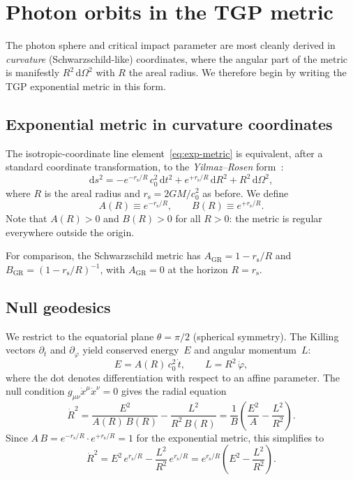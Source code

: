 \documentclass[11pt,a4paper]{article}
\theoremstyle{definition}
\theoremstyle{remark}
\newcommand{\rs}{r_{\mathrm{s}}}
\newcommand{\dd}{\mathrm{d}}
\begin{document}
\section{Photon orbits in the TGP metric}\label{sec:photon}

The photon sphere and critical impact parameter are most cleanly derived
in \emph{curvature} (Schwarzschild-like) coordinates, where the angular
part of the metric is manifestly $R^2\,\dd\Omega^2$ with $R$ the areal
radius.  We therefore begin by writing the TGP exponential metric in
this form.

\subsection{Exponential metric in curvature coordinates}

The isotropic-coordinate line element~\eqref{eq:exp-metric} is
equivalent, after a standard coordinate transformation, to the
\emph{Yilmaz--Rosen} form~\cite{Perlick2022,Rezzolla2014}:
\begin{equation}\label{eq:metric-curvature}
  \dd s^2 = -e^{-\rs/R}\,c_0^2\,\dd t^2
    + e^{+\rs/R}\,\dd R^2
    + R^2\,\dd\Omega^2,
\end{equation}
where $R$ is the areal radius and $\rs = 2GM/c_0^2$ as before.  We
define
\begin{equation}\label{eq:AB-def}
  A(R) \equiv e^{-\rs/R}, \qquad B(R) \equiv e^{+\rs/R}.
\end{equation}
Note that $A(R) > 0$ and $B(R) > 0$ for all $R > 0$: the metric is
regular everywhere outside the origin.

For comparison, the Schwarzschild metric has $A_{\mathrm{GR}} = 1 -
\rs/R$ and $B_{\mathrm{GR}} = (1 - \rs/R)^{-1}$, with $A_{\mathrm{GR}}
= 0$ at the horizon $R = \rs$.

\subsection{Null geodesics}

We restrict to the equatorial plane $\theta = \pi/2$ (spherical
symmetry).  The Killing vectors $\partial_t$ and $\partial_\varphi$
yield conserved energy~$E$ and angular momentum~$L$:
\begin{equation}\label{eq:conserved}
  E = A(R)\,c_0^2\,\dot{t},
  \qquad
  L = R^2\,\dot{\varphi},
\end{equation}
where the dot denotes differentiation with respect to an affine
parameter.  The null condition
$g_{\mu\nu}\dot{x}^\mu\dot{x}^\nu = 0$ gives the radial equation
\begin{equation}\label{eq:radial-null}
  \dot{R}^2 = \frac{E^2}{A(R)\,B(R)}
    - \frac{L^2}{R^2\,B(R)}
  = \frac{1}{B}\!\left(\frac{E^2}{A}
    - \frac{L^2}{R^2}\right).
\end{equation}
Since $A\,B = e^{-\rs/R}\cdot e^{+\rs/R} = 1$ for the exponential
metric, this simplifies to
\begin{equation}\label{eq:radial-simple}
  \dot{R}^2 = E^2\,e^{\rs/R}
    - \frac{L^2}{R^2}\,e^{\rs/R}
  = e^{\rs/R}\!\left(E^2 - \frac{L^2}{R^2}\right).
\end{equation}
\end{document}
